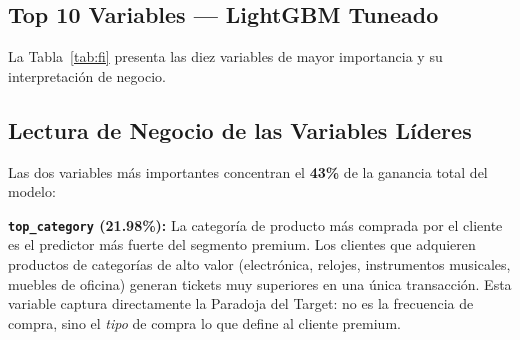 \documentclass[journal,letterpaper]{IEEEtran}
\begin{document}
\subsection{Top 10 Variables — LightGBM Tuneado}
La Tabla~\ref{tab:fi} presenta las diez variables de mayor importancia y su interpretación de negocio.

\begin{table}[h]
\centering
\caption{Top 10 Variables por Importancia de Ganancia — LightGBM Tuneado}
\label{tab:fi}
\end{table}

\subsection{Lectura de Negocio de las Variables Líderes}
Las dos variables más importantes concentran el \textbf{43\%} de la ganancia total del modelo:

\textbf{\texttt{top\_category} (21.98\%):} La categoría de producto más comprada por el cliente es el predictor más fuerte del segmento premium. Los clientes que adquieren productos de categorías de alto valor (electrónica, relojes, instrumentos musicales, muebles de oficina) generan tickets muy superiores en una única transacción. Esta variable captura directamente la Paradoja del Target: no es la frecuencia de compra, sino el \textit{tipo} de compra lo que define al cliente premium.
\end{document}
